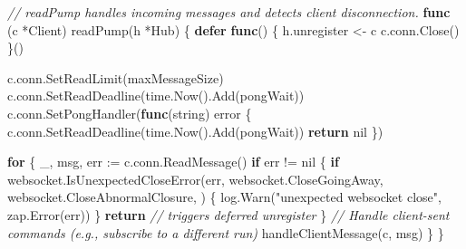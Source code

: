 \documentclass[
]{article}
\newenvironment{Shaded}{}{}
\newcommand{\CommentTok}[1]{\textcolor[rgb]{0.38,0.63,0.69}{\textit{#1}}}
\newcommand{\ControlFlowTok}[1]{\textcolor[rgb]{0.00,0.44,0.13}{\textbf{#1}}}
\newcommand{\DataTypeTok}[1]{\textcolor[rgb]{0.56,0.13,0.00}{#1}}
\newcommand{\KeywordTok}[1]{\textcolor[rgb]{0.00,0.44,0.13}{\textbf{#1}}}
\newcommand{\NormalTok}[1]{#1}
\newcommand{\OperatorTok}[1]{\textcolor[rgb]{0.40,0.40,0.40}{#1}}
\newcommand{\OtherTok}[1]{\textcolor[rgb]{0.00,0.44,0.13}{#1}}
\newcommand{\StringTok}[1]{\textcolor[rgb]{0.25,0.44,0.63}{#1}}
\begin{document}
\begin{Shaded}
\begin{Highlighting}[]
\CommentTok{// readPump handles incoming messages and detects client disconnection.}
\KeywordTok{func} \OperatorTok{(}\NormalTok{c }\OperatorTok{*}\NormalTok{Client}\OperatorTok{)}\NormalTok{ readPump}\OperatorTok{(}\NormalTok{h }\OperatorTok{*}\NormalTok{Hub}\OperatorTok{)} \OperatorTok{\{}
    \ControlFlowTok{defer} \KeywordTok{func}\OperatorTok{()} \OperatorTok{\{}
\NormalTok{        h}\OperatorTok{.}\NormalTok{unregister }\OperatorTok{\textless{}{-}}\NormalTok{ c}
\NormalTok{        c}\OperatorTok{.}\NormalTok{conn}\OperatorTok{.}\NormalTok{Close}\OperatorTok{()}
    \OperatorTok{\}()}

\NormalTok{    c}\OperatorTok{.}\NormalTok{conn}\OperatorTok{.}\NormalTok{SetReadLimit}\OperatorTok{(}\NormalTok{maxMessageSize}\OperatorTok{)}
\NormalTok{    c}\OperatorTok{.}\NormalTok{conn}\OperatorTok{.}\NormalTok{SetReadDeadline}\OperatorTok{(}\NormalTok{time}\OperatorTok{.}\NormalTok{Now}\OperatorTok{().}\NormalTok{Add}\OperatorTok{(}\NormalTok{pongWait}\OperatorTok{))}
\NormalTok{    c}\OperatorTok{.}\NormalTok{conn}\OperatorTok{.}\NormalTok{SetPongHandler}\OperatorTok{(}\KeywordTok{func}\OperatorTok{(}\DataTypeTok{string}\OperatorTok{)} \DataTypeTok{error} \OperatorTok{\{}
\NormalTok{        c}\OperatorTok{.}\NormalTok{conn}\OperatorTok{.}\NormalTok{SetReadDeadline}\OperatorTok{(}\NormalTok{time}\OperatorTok{.}\NormalTok{Now}\OperatorTok{().}\NormalTok{Add}\OperatorTok{(}\NormalTok{pongWait}\OperatorTok{))}
        \ControlFlowTok{return} \OtherTok{nil}
    \OperatorTok{\})}

    \ControlFlowTok{for} \OperatorTok{\{}
\NormalTok{        \_}\OperatorTok{,}\NormalTok{ msg}\OperatorTok{,}\NormalTok{ err }\OperatorTok{:=}\NormalTok{ c}\OperatorTok{.}\NormalTok{conn}\OperatorTok{.}\NormalTok{ReadMessage}\OperatorTok{()}
        \ControlFlowTok{if}\NormalTok{ err }\OperatorTok{!=} \OtherTok{nil} \OperatorTok{\{}
            \ControlFlowTok{if}\NormalTok{ websocket}\OperatorTok{.}\NormalTok{IsUnexpectedCloseError}\OperatorTok{(}\NormalTok{err}\OperatorTok{,}
\NormalTok{                websocket}\OperatorTok{.}\NormalTok{CloseGoingAway}\OperatorTok{,}
\NormalTok{                websocket}\OperatorTok{.}\NormalTok{CloseAbnormalClosure}\OperatorTok{,}
            \OperatorTok{)} \OperatorTok{\{}
\NormalTok{                log}\OperatorTok{.}\NormalTok{Warn}\OperatorTok{(}\StringTok{"unexpected websocket close"}\OperatorTok{,}\NormalTok{ zap}\OperatorTok{.}\NormalTok{Error}\OperatorTok{(}\NormalTok{err}\OperatorTok{))}
            \OperatorTok{\}}
            \ControlFlowTok{return} \CommentTok{// triggers deferred unregister}
        \OperatorTok{\}}
        \CommentTok{// Handle client{-}sent commands (e.g., subscribe to a different run)}
\NormalTok{        handleClientMessage}\OperatorTok{(}\NormalTok{c}\OperatorTok{,}\NormalTok{ msg}\OperatorTok{)}
    \OperatorTok{\}}
\OperatorTok{\}}


\end{Highlighting}
\end{Shaded}
\end{document}
